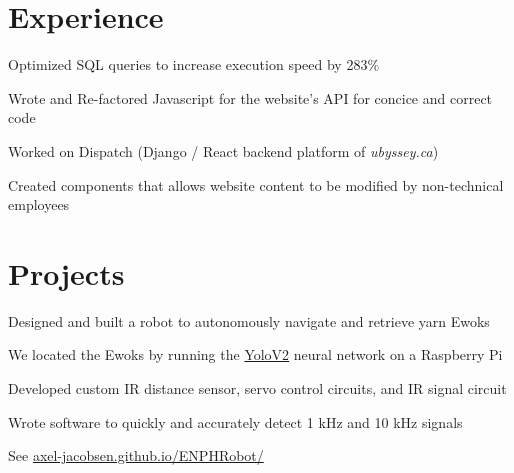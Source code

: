 \documentclass[]{deedy-resume-openfont}
\begin{document}

\section{Experience}

\begin{tightemize}
	\item Optimized SQL queries to increase execution speed by 283\%
	\item Wrote and Re-factored Javascript for the website’s API for concice and correct code
\end{tightemize}
\sectionsep

\begin{tightemize}
	\item Worked on Dispatch (Django / React backend platform of \textit{ubyssey.ca})
    \item Created components that allows website content to be modified by non-technical employees
    \vspace{15pt}
\end{tightemize}
\sectionsep

\section{Projects}

\begin{tightemize}
	\item Designed and built a robot to autonomously navigate and retrieve yarn Ewoks
	\item We located the Ewoks by running the \href{https://pjreddie.com/darknet/yolov2/}{YoloV2} neural network on a Raspberry Pi
	\item Developed custom IR distance sensor, servo control circuits, and IR signal circuit
	\item Wrote software to quickly and accurately detect 1 kHz and 10 kHz signals
	\item See \href{https://axel-jacobsen.github.io/ENPHRobot/}{axel-jacobsen.github.io/ENPHRobot/}
\end{tightemize}
\sectionsep
\end{document}
